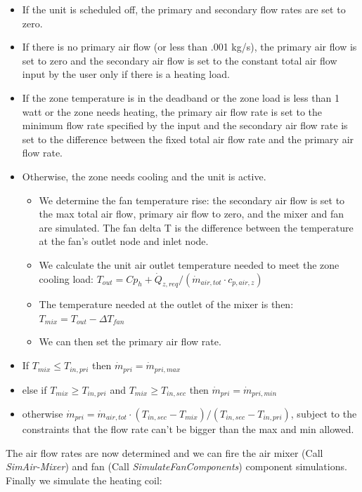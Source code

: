 \begin{itemize}
  \item
    If the unit is scheduled off, the primary and secondary flow rates are set to zero.
  \item
    If there is no primary air flow (or less than .001 kg/s), the primary air flow is set to zero and the secondary air flow is set to the constant total air flow input by the user only if there is a heating load.
  \item
    If the zone temperature is in the deadband or the zone load is less than 1 watt or the zone needs heating, the primary air flow rate is set to the minimum flow rate specified by the input and the secondary air flow rate is set to the difference between the fixed total air flow rate and the primary air flow rate.
  \item
    Otherwise, the zone needs cooling and the unit is active.
    \begin{itemize}
      \item 
        We determine the fan temperature rise: the secondary air flow is set to the max total air flow, primary air flow to zero, and the mixer and fan are simulated. The fan delta T is the difference between the temperature at the fan's outlet node and inlet node.
      \item
        We calculate the unit air outlet temperature needed to meet the zone cooling load: \({T_{out}} = C{p_h} + {\dot Q_{z,req}}/({\dot m_{air,tot}}\cdot {c_{p,air,z}})\)
      \item
        The temperature needed at the outlet of the mixer is then: \({T_{mix}} = {T_{out}} - \Delta {T_{fan}}\)
      \item
        We can then set the primary air flow rate.
    \end{itemize}
  \item
    If \({T_{mix}} \le {T_{in,pri}}\) then \({\dot m_{pri}} = {\dot m_{pri,max}}\)
  \item
    else if \({T_{mix}} \ge {T_{in,pri}}\) and \({T_{mix}} \ge {T_{in,sec}}\) then \({\dot m_{pri}} = {\dot m_{pri,min}}\)
  \item
    otherwise \({\dot m_{pri}} = {\dot m_{air,tot}}\cdot ({T_{in,sec}} - {T_{mix}})/({T_{in,sec}} - {T_{in,pri}})\), subject to the constraints that the flow rate can't be bigger than the max and min allowed.
\end{itemize}

The air flow rates are now determined and we can fire the air mixer (Call \emph{SimAir-Mixer}) and fan (Call \emph{SimulateFanComponents}) component simulations. Finally we simulate the heating coil:

